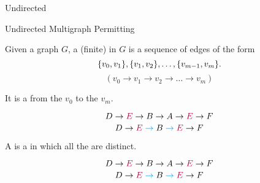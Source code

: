 \begin{frame}{}

  \pause
  \begin{center}
    {Undirected }
  \end{center}
\end{frame}

\begin{frame}{}

  \pause
  \vspace{-0.50cm}
  \begin{center}
    {Undirected Multigraph Permitting }
  \end{center}
\end{frame}

\begin{frame}{}
  \begin{definition}[Walk (道路)]
    Given a graph $G$, a (finite)  in $G$ is a sequence of edges of the form
    \[
      \{v_{0}, v_{1}\}, \{v_{1}, v_{2}\}, \dots, \{v_{m-1}, v_{m}\}.
    \]
    \[
      (v_{0} \to v_{1} \to v_{2} \to \dots \to v_{m})
    \]
    \pause
    \vspace{-0.80cm}
    \begin{center}
      It is a  from the  $v_{0}$ to the  $v_{m}$.
    \end{center}
  \end{definition}

  \pause
  \[
    D \to \textcolor{purple}{E} \to B \to A \to \textcolor{purple}{E} \to F
  \]
  \pause
  \[
    D \to \textcolor{purple}{E} \;\textcolor{cyan}{\to}\; B \;\textcolor{cyan}{\to}\; \textcolor{purple}{E} \to F
  \]
\end{frame}

\begin{frame}{}
  \begin{definition}[Trail (迹)]
    A  is a  in which all the  are distinct.
  \end{definition}

  \pause
  \[
    D \to \textcolor{purple}{E} \to B \to A \to \textcolor{purple}{E} \to F
  \]
  \[
    D \to \textcolor{purple}{E} \;\textcolor{cyan}{\to}\; B \;\textcolor{cyan}{\to}\; \textcolor{purple}{E} \to F
  \]
\end{frame}

